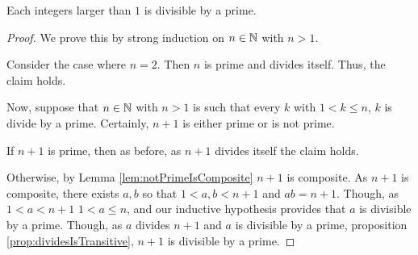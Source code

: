 \guard




\begin{prop}
\label{prop:naturalsLargerThanOneDivisibleByPrime}
  Each integers larger than $1$ is divisible by a prime.
\end{prop}
\begin{proof}
  We prove this by strong induction on $n\in\mathbb{N}$ with $n>1$.

  Consider the case where $n=2$.
  Then $n$ is prime and divides itself.
  Thus, the claim holds.

  Now, suppose that $n\in\mathbb{N}$ with $n>1$ is such that every $k$ with $1<k\leq n$, $k$ is divide by a prime.
  Certainly, $n+1$ is either prime or is not prime.

  If $n+1$ is prime, then as before, as $n+1$ divides itself the claim holds.

  Otherwise, by Lemma \ref{lem:notPrimeIsComposite} $n+1$ is composite.
  As $n+1$ is composite, there exists $a, b$ so that $1<a,b<n+1$ and $ab = n+1$.
  Though, as $1<a<n+1$ $1<a \leq n$, and our inductive hypothesis provides that $a$ is divisible by a prime.
  Though, as $a$ divides $n+1$ and $a$ is divisible by a prime, proposition \ref{prop:dividesIsTransitive}, $n+1$ is divisible by a prime.
\end{proof}
